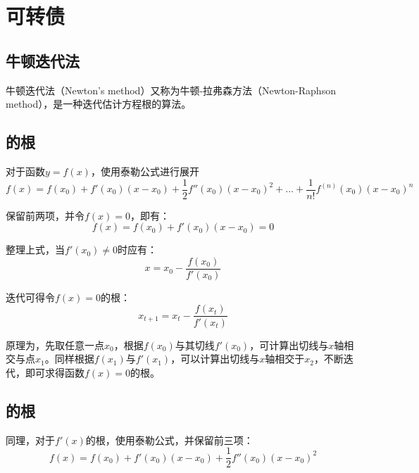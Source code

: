 \documentclass[11pt]{article}
\begin{document}
\section{可转债}


\appendix

\begin{appendices}

\section{牛顿迭代法}

牛顿迭代法（Newton's method）又称为牛顿-拉弗森方法（Newton-Raphson method），是一种迭代估计方程根的算法。

\subsection{的根}

对于函数$y = f(x)$，使用泰勒公式进行展开
\begin{equation*}
    f(x) = f(x_0) + f'(x_0)(x-x_0) + \frac{1}{2}f''(x_0)(x-x_0)^2 + \dots + \frac{1}{n!}f^{(n)}(x_0)(x-x_0)^n
\end{equation*}

保留前两项，并令$f(x) = 0$，即有：
\begin{equation*}
    f(x) = f(x_0) + f'(x_0)(x-x_0) = 0
\end{equation*}

整理上式，当$f'(x_0) \neq 0$时应有：
\begin{equation*}
    x = x_0 - \frac{f(x_0)}{f'(x_0)}
\end{equation*}

迭代可得令$f(x) = 0$的根：
\begin{equation*}
    x_{t+1} = x_t - \frac{f(x_t)}{f'(x_t)}
\end{equation*}

\begin{remark}
    原理为，先取任意一点$x_0$，根据$f(x_0)$与其切线$f'(x_0)$，可计算出切线与$x$轴相交与点$x_1$。同样根据$f(x_1)$与$f'(x_1)$，可以计算出切线与$x$轴相交于$x_2$，不断迭代，即可求得函数$f(x)=0$的根。
\end{remark}

\subsection{的根}

同理，对于$f'(x)$的根，使用泰勒公式，并保留前三项：
\begin{equation*}
    f(x) = f(x_0) + f'(x_0)(x-x_0) + \frac{1}{2}f''(x_0)(x-x_0)^2
\end{equation*}


\end{appendices}
\end{document}
